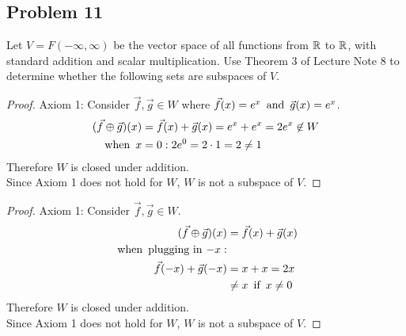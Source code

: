 \subsection*{Problem 11}
Let $V = F(-\infty, \infty)$ be the vector space of all functions from $\mathbb{R}$ to $\mathbb{R}$, with standard addition and scalar multiplication. Use Theorem 3 of Lecture Note 8 to determine whether the following sets are subspaces of $V$.
\begin{enumerate}
  \begin{proof}
    Axiom 1: Consider $\vec{f},\vec{g} \in W$ where $\vec{f}(x) = e^x \operatorname{~\text{and}~} \vec{g}(x) = e^x$.
    \begin{align*}
      (\vec{f} \oplus \vec{g})(x) & = \vec{f}(x) + \vec{g}(x) = e^x + e^x = 2e^x \not \in W \\
      \operatorname{~\text{when}~} x                    & = 0: 2e^0 = 2 \cdot 1 = 2 \neq 1
    \end{align*}
    Therefore $W$ is  closed under addition. \\
    Since Axiom 1 does not hold for $W$, $W$ is not a subspace of $V$.
  \end{proof}
  \begin{proof}
    Axiom 1: Consider $\vec{f}, \vec{g} \in W$.
    \begin{align*}
      (\vec{f} \oplus \vec{g})(x) & = \vec{f}(x) + \vec{g}(x) \\
      \operatorname{~\text{when}~} \text{plugging in $-x$}:                         \\
      \vec{f}(-x) + \vec{g}(-x)   & = x + x = 2x              \\
                                  & \neq x \operatorname{~\text{if}~} x \neq 0
    \end{align*}
    Therefore $W$ is  closed under addition. \\
    Since Axiom 1 does not hold for $W$, $W$ is not a subspace of $V$.
  \end{proof}
\end{enumerate}

